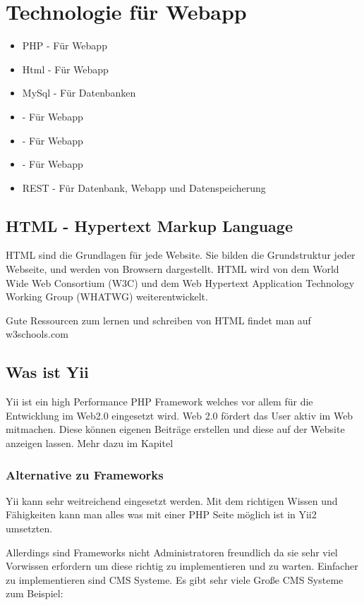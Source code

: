 \newpage	
\def \currentAuthor {Florian Tipotsch}
	\section{Technologie für Webapp}
\begin{itemize}
	\item PHP - Für Webapp
	\item Html - Für Webapp 	
	\item MySql - Für Datenbanken
	\item {} - Für Webapp
	\item {} - Für Webapp
	\item {} - Für Webapp
	\item REST - Für Datenbank, Webapp und Datenspeicherung
\end{itemize}
	\subsection{HTML - Hypertext Markup Language}
	HTML sind die Grundlagen für jede Website. Sie bilden die Grundstruktur jeder Webseite, und werden von Browsern dargestellt. HTML wird von dem World Wide Web Consortium (W3C) \cite{W3C} und dem Web Hypertext Application Technology Working Group (WHATWG) \cite{WHATWG} weiterentwickelt.
	
	Gute Ressourcen zum lernen und schreiben von HTML findet man auf w3schools.com \cite {W3schools}
	
	\subsection{Was ist Yii}
	Yii ist ein high Performance PHP Framework welches vor allem für die Entwicklung im Web2.0 eingesetzt wird. Web 2.0 fördert das User aktiv im Web mitmachen. Diese können eigenen Beiträge erstellen und diese auf der Website anzeigen lassen. Mehr dazu im Kapitel \cite{Web_2}

	\subsubsection{Alternative zu Frameworks}
	Yii kann sehr weitreichend eingesetzt werden. Mit dem richtigen Wissen und Fähigkeiten kann man alles was mit einer PHP Seite möglich ist in Yii2 umsetzten.

Allerdings sind Frameworks nicht Administratoren freundlich da sie sehr viel Vorwissen erfordern um diese richtig zu implementieren und zu warten. Einfacher zu implementieren sind CMS Systeme. Es gibt sehr viele Große CMS Systeme zum Beispiel:

